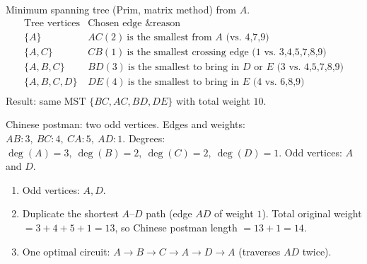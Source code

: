 \documentclass[11pt]{article}
\def\textbf#1{#1}%
\begin{document}
\begin{solution}
\textbf{Minimum spanning tree (Prim, matrix method) from $A$.}
\[
\begin{array}{l|l}
\text{Tree vertices} & \text{Chosen edge \& reason}\\\hline
\{A\} & AC(2)\ \text{is the smallest from $A$ (vs.\ 4,7,9)}\\
\{A,C\} & CB(1)\ \text{is the smallest crossing edge (1 vs.\ 3,4,5,7,8,9)}\\
\{A,B,C\} & BD(3)\ \text{is the smallest to bring in $D$ or $E$ (3 vs.\ 4,5,7,8,9)}\\
\{A,B,C,D\} & DE(4)\ \text{is the smallest to bring in $E$ (4 vs.\ 6,8,9)}\\
\end{array}
\]
Result: same MST $\{BC,AC,BD,DE\}$ with total weight $10$.
\end{solution}

\begin{solution}
\textbf{Chinese postman: two odd vertices.}
Edges and weights: $AB:3,\ BC:4,\ CA:5,\ AD:1$.
Degrees: $\deg(A)=3,\ \deg(B)=2,\ \deg(C)=2,\ \deg(D)=1$.
Odd vertices: $A$ and $D$.
\begin{enumerate}
  \item Odd vertices: $A,D$.
  \item Duplicate the shortest $A$–$D$ path (edge $AD$ of weight $1$). Total original weight $=3+4+5+1=13$, so Chinese postman length $=13+1=14$.
  \item One optimal circuit: $A\to B\to C\to A\to D\to A$ (traverses $AD$ twice).
\end{enumerate}

\begin{center}
\end{center}
\end{solution}
\end{document}
